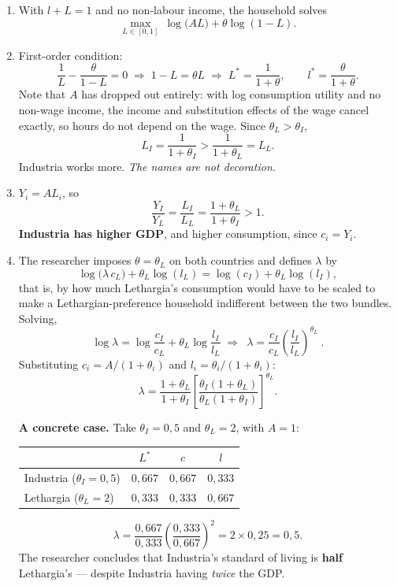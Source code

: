 \documentclass[12pt, letterpaper]{article}
\newcommand{\stst}{^{\ast}}
\begin{document}
\begin{tcolorbox}[oddbox,title={Problem 9.5 \quad Differences in Preferences}]
\begin{enumerate}
\item With $l+L=1$ and no non-labour income, the household solves
\[
\max_{L\in[0,1]}\ \log\big(A L\big)+\theta\log(1-L).
\]

\item First-order condition:
\[
\frac{1}{L}-\frac{\theta}{1-L}=0
\;\Longrightarrow\;
1-L=\theta L
\;\Longrightarrow\;
\boxed{L\stst=\frac{1}{1+\theta}},\qquad l\stst=\frac{\theta}{1+\theta}.
\]
Note that $A$ has dropped out entirely: with log consumption utility and no non-wage income,
the income and substitution effects of the wage cancel exactly, so hours do not depend on
the wage. Since $\theta_L>\theta_I$,
\[
L_I=\frac{1}{1+\theta_I}>\frac{1}{1+\theta_L}=L_L .
\]
Industria works more. \emph{The names are not decoration.}

\item $Y_i=A L_i$, so
\[
\frac{Y_I}{Y_L}=\frac{L_I}{L_L}=\frac{1+\theta_L}{1+\theta_I}>1 .
\]
\textbf{Industria has higher GDP}, and higher consumption, since $c_i=Y_i$.

\item The researcher imposes $\theta=\theta_L$ on both countries and defines $\lambda$ by
\[
\log\big(\lambda\,c_L\big)+\theta_L\log(l_L)=\log(c_I)+\theta_L\log(l_I),
\]
that is, by how much Lethargia's consumption would have to be scaled to make a
Lethargian-preference household indifferent between the two bundles. Solving,
\[
\log\lambda=\log\frac{c_I}{c_L}+\theta_L\log\frac{l_I}{l_L}
\;\Longrightarrow\;
\boxed{\ \lambda=\frac{c_I}{c_L}\left(\frac{l_I}{l_L}\right)^{\theta_L}\ }.
\]
Substituting $c_i=A/(1+\theta_i)$ and $l_i=\theta_i/(1+\theta_i)$:
\[
\lambda=\frac{1+\theta_L}{1+\theta_I}
\left[\frac{\theta_I(1+\theta_L)}{\theta_L(1+\theta_I)}\right]^{\theta_L}.
\]

\textbf{A concrete case.} Take $\theta_I=0{,}5$ and $\theta_L=2$, with $A=1$:
\begin{center}
\begin{tabular}{lccc}
\toprule
& $L\stst$ & $c$ & $l$ \\
\midrule
Industria ($\theta_I=0{,}5$) & $0{,}667$ & $0{,}667$ & $0{,}333$ \\
Lethargia ($\theta_L=2$) & $0{,}333$ & $0{,}333$ & $0{,}667$ \\
\bottomrule
\end{tabular}
\end{center}
\[
\lambda=\frac{0{,}667}{0{,}333}\left(\frac{0{,}333}{0{,}667}\right)^{2}
=2\times 0{,}25=\boxed{0{,}5}.
\]
The researcher concludes that Industria's standard of living is \textbf{half} Lethargia's
--- despite Industria having \emph{twice} the GDP.


\end{enumerate}
\end{tcolorbox}
\end{document}
